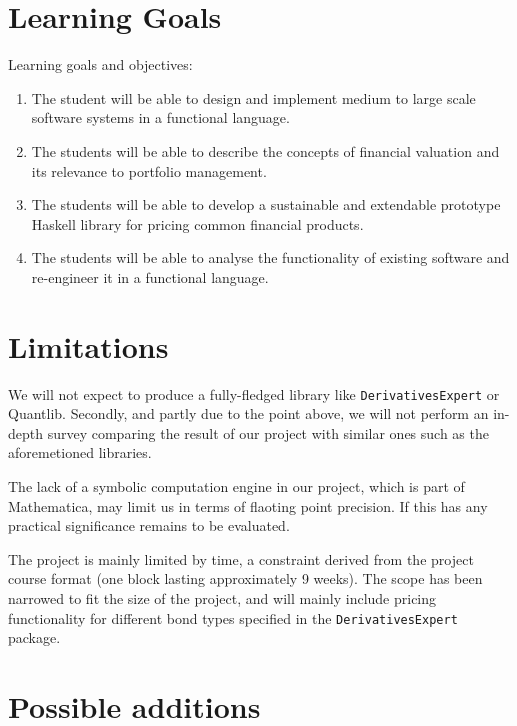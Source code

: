 \documentclass[11pt]{article}
\begin{document}
\section*{Learning Goals}

Learning goals and objectives:

\begin{enumerate}
\item The student will be able to design and implement medium to large scale software systems in a functional language. %
\item The students will be able to describe the concepts of financial valuation and its relevance to portfolio management. %
\item The students will be able to develop a sustainable and extendable prototype Haskell library for pricing common financial products. %
\item The students will be able to analyse the functionality of existing software and re-engineer it in a functional language.
\end{enumerate}

\section*{Limitations}

We will not expect to produce a fully-fledged library like {\tt DerivativesExpert} or Quantlib\cite{Ame2003}.
Secondly, and partly due to the point above, we will not perform an in-depth survey
comparing the result of our project with similar ones such as the aforemetioned libraries.

The lack of a symbolic computation engine in our project, which is part of Mathematica, may limit us
in terms of flaoting point precision. If this has any practical significance remains to be evaluated.


The project is mainly limited by time, a constraint derived from the project course 
format (one block lasting approximately 9 weeks).
The scope has been narrowed to fit the size of the project, and will mainly include
pricing functionality for different bond types specified in the {\tt DerivativesExpert} package.




\section*{Possible additions}
\end{document}
